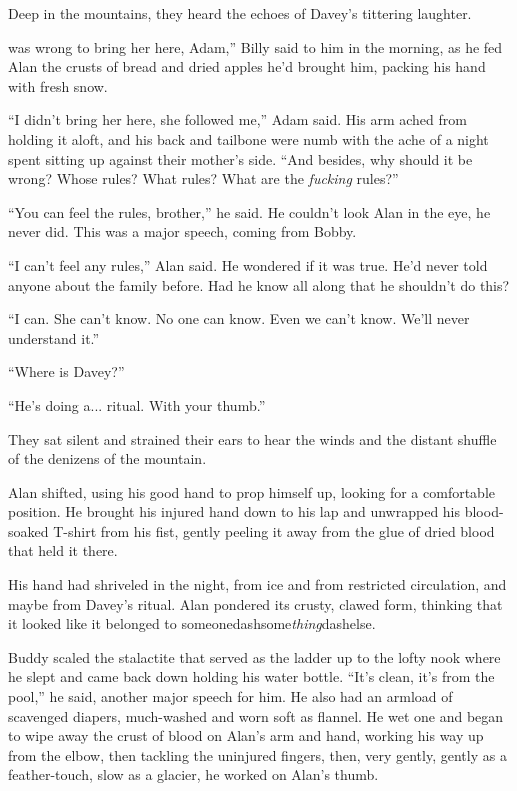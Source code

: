 Deep in the mountains, they heard the echoes of Davey's tittering
laughter.

was wrong to bring her here, Adam,'' Billy said to him in the
morning, as he fed Alan the crusts of bread and dried apples he'd
brought him, packing his hand with fresh snow.

``I didn't bring her here, she followed me,'' Adam said.  His arm
ached from holding it aloft, and his back and tailbone were numb with
the ache of a night spent sitting up against their mother's side. 
``And besides, why should it be wrong?  Whose rules?  What rules? 
What are the \textit{fucking} rules?''

``You can feel the rules, brother,'' he said.  He couldn't look Alan
in the eye, he never did.  This was a major speech, coming from Bobby.

``I can't feel any rules,'' Alan said.  He wondered if it was true. 
He'd never told anyone about the family before.  Had he know all along
that he shouldn't do this?

``I can.  She can't know.  No one can know.  Even we can't know. 
We'll never understand it.''

``Where is Davey?''

``He's doing a...  ritual.  With your thumb.''

They sat silent and strained their ears to hear the winds and the
distant shuffle of the denizens of the mountain.

Alan shifted, using his good hand to prop himself up, looking for a
comfortable position.  He brought his injured hand down to his lap and
unwrapped his blood-soaked T-shirt from his fist, gently peeling it
away from the glue of dried blood that held it there.

His hand had shriveled in the night, from ice and from restricted
circulation, and maybe from Davey's ritual.  Alan pondered its crusty,
clawed form, thinking that it looked like it belonged to
someonedash{}some\textit{thing}dash{}else.

Buddy scaled the stalactite that served as the ladder up to the lofty
nook where he slept and came back down holding his water bottle. 
``It's clean, it's from the pool,'' he said, another major speech for
him.  He also had an armload of scavenged diapers, much-washed and
worn soft as flannel.  He wet one and began to wipe away the crust of
blood on Alan's arm and hand, working his way up from the elbow, then
tackling the uninjured fingers, then, very gently, gently as a
feather-touch, slow as a glacier, he worked on Alan's thumb.

